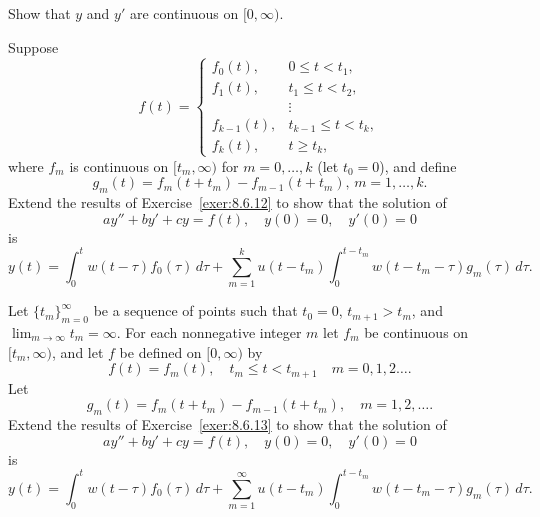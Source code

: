 \begin{exerciselist}
\begin{alist}
    \item %
    Show that $y$ and $y'$ are continuous on $[0,\infty)$.
  \end{alist}

  \item\label{exer:8.6.13} Suppose
  \[
    f(t)=\left\{
    \begin{array}{cl}
      f_{0}(t),   & 0\le t<t_{1},       \\[5pt]
      f_{1}(t),   & t_{1}\le t<t_{2},   \\
                  & \vdots              \\
      f_{k-1}(t), & t_{k-1}\le t<t_{k}, \\[5pt]
      f_{k}(t),   & t\ge t_{k},
    \end{array}\right.
  \]
  where $f_{m}$ is continuous on $[t_{m},\infty)$ for $m=0,\dots,k$ (let $t_{0}=0$), and define
  \[
    g_{m}(t)=f_{m}(t+t_{m})-f_{m-1}(t+t_{m}),\,m=1,\dots,k.
  \]
  Extend the results of Exercise~\ref{exer:8.6.12} to show that the solution of
  \[
    ay''+by'+cy=f(t),\quad y(0)=0,\quad y'(0)=0
  \]
  is
  \[
    y(t)=\int_{0}^{t}w(t-\tau)f_{0}(\tau)\,d\tau+\sum_{m=1}^{k}u(t-t_{m}) \int_{0}^{t-t_{m}}w(t-t_{m}-\tau)g_{m}(\tau)\,d\tau.
  \]

  \item\label{exer:8.6.14} Let $\{t_{m}\}_{m=0}^{\infty}$ be a sequence of points such that
        $t_{0}=0$, $t_{m+1}>t_{m}$, and $\lim_{m\to\infty}t_{m}=\infty$. For each nonnegative
        integer $m$ let $f_{m}$ be continuous on $[t_{m},\infty)$, and let $f$ be defined on
        $[0,\infty)$ by
  \[
    f(t)=f_{m}(t),\quad t_{m}\le t<t_{m+1}\quad m=0,1,2\dots.
  \]
  Let
  \[
    g_{m}(t)=f_{m}(t+t_{m})-f_{m-1}(t+t_{m}),\quad m=1,2,\dots.
  \]
  Extend the results of Exercise~\ref{exer:8.6.13} to show that the solution of
  \[
    ay''+by'+cy=f(t),\quad y(0)=0,\quad y'(0)=0
  \]
  is
  \[
    y(t)=\int_{0}^{t}w(t-\tau)f_{0}(\tau)\,d\tau+\sum_{m=1}^{\infty}u(t-t_{m}) \int_{0}^{t-t_{m}}w(t-t_{m}-\tau)g_{m}(\tau) \,d\tau.
  \]
\end{exerciselist}
